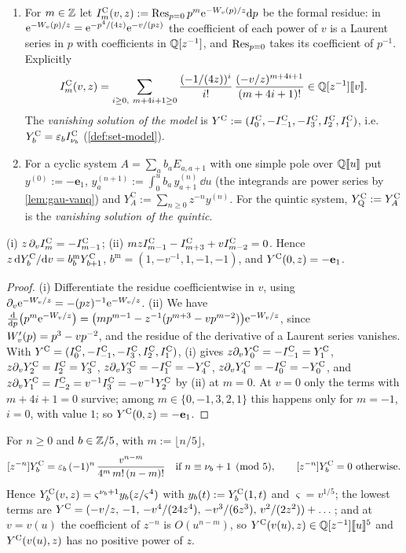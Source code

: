 \begin{defn}
\label{def:gau-van}
\begin{enumerate}
\item For $m\in\mathbb{Z}$ let $I^{\mathrm{C}}_m(v,z):=\operatorname*{Res}_{p=0}p^m\mathrm{e}^{-W_{v}(p)/z}\mathrm{d} p$ be the formal residue: in $\mathrm{e}^{-W_{v}(p)/z}=\mathrm{e}^{-p^4/(4z)}\mathrm{e}^{-v/(pz)}$ the coefficient of each power of $v$ is a Laurent series in $p$ with coefficients in $\mathbb{Q}[z^{-1}]$, and $\operatorname*{Res}_{p=0}$ takes its coefficient of $p^{-1}$. Explicitly
\[
\IC_m(v,z)=\sum_{i\geq0,\ m+4i+1\geq0}\frac{(-1/(4z))^i}{i!}\,\frac{(-v/z)^{m+4i+1}}{(m+4i+1)!}\in\bbQ[z^{-1}]\fps v .
\]
The \emph{vanishing solution of the model} is $Y^{\mathrm{C}}:=(I^{\mathrm{C}}_0,-I^{\mathrm{C}}_{-1},-I^{\mathrm{C}}_3,I^{\mathrm{C}}_2,I^{\mathrm{C}}_1)$, i.e.\ $Y^{\mathrm{C}}_b=\varepsilon_bI^{\mathrm{C}}_{\nu_b}$ (\cref{def:set-model}).
\item For a cyclic system $A=\sum_ab_aE_{a,a+1}$ with one simple pole over $\mathbb{Q}[\![ u ]\!]$ put $y^{(0)}:=-\mathbf e_1$, $y^{(n+1)}_a:=\int_0^ub_a\,y^{(n)}_{a+1}\,\dd u$ (the integrands are power series by \cref{lem:gau-vanq}) and $Y^{\mathrm C}_A:=\sum_{n\geq0}z^{-n}y^{(n)}$. For the quintic system, $Y^{\mathrm{C}}_{\mathrm{Q}}:=Y^{\mathrm C}_A$ is the \emph{vanishing solution of the quintic}.
\end{enumerate}
\end{defn}

\begin{lem}
\label{lem:gau-vanmod}
(i) $z\,\partial_vI^{\mathrm{C}}_m=-I^{\mathrm{C}}_{m-1}$; (ii) $mzI^{\mathrm{C}}_{m-1}-I^{\mathrm{C}}_{m+3}+vI^{\mathrm{C}}_{m-2}=0$. Hence $z\,\mathrm{d}Y^{\mathrm{C}}_b/\mathrm{d} v=b^{\mathrm m}_bY^{\mathrm{C}}_{b+1}$, $b^{\mathrm m}=(1,-v^{-1},1,-1,-1)$, and $Y^{\mathrm{C}}(0,z)=-\mathbf e_1$.
\end{lem}

\begin{proof}
(i) Differentiate the residue coefficientwise in $v$, using $\partial_v\mathrm{e}^{-W_{v}/z}=-(pz)^{-1}\mathrm{e}^{-W_{v}/z}$. (ii) We have $\frac{\mathrm{d}}{\mathrm{d} p}\bigl(p^m\mathrm{e}^{-W_{v}/z}\bigr)=\bigl(mp^{m-1}-z^{-1}(p^{m+3}-vp^{m-2})\bigr)\mathrm{e}^{-W_{v}/z}$, since $W_{v}'(p)=p^3-vp^{-2}$, and the residue of the derivative of a Laurent series vanishes. With $Y^{\mathrm{C}}=(I^{\mathrm{C}}_0,-I^{\mathrm{C}}_{-1},-I^{\mathrm{C}}_3,I^{\mathrm{C}}_2,I^{\mathrm{C}}_1)$, (i) gives $z\partial_vY^{\mathrm{C}}_0=-I^{\mathrm{C}}_{-1}=Y^{\mathrm{C}}_1$, $z\partial_vY^{\mathrm{C}}_2=I^{\mathrm{C}}_2=Y^{\mathrm{C}}_3$, $z\partial_vY^{\mathrm{C}}_3=-I^{\mathrm{C}}_1=-Y^{\mathrm{C}}_4$, $z\partial_vY^{\mathrm{C}}_4=-I^{\mathrm{C}}_0=-Y^{\mathrm{C}}_0$, and $z\partial_vY^{\mathrm{C}}_1=I^{\mathrm{C}}_{-2}=v^{-1}I^{\mathrm{C}}_3=-v^{-1}Y^{\mathrm{C}}_2$ by (ii) at $m=0$. At $v=0$ only the terms with $m+4i+1=0$ survive; among $m\in\{0,-1,3,2,1\}$ this happens only for $m=-1$, $i=0$, with value $1$; so $Y^{\mathrm{C}}(0,z)=-\mathbf e_1$.
\end{proof}

\begin{lem}[Shape of $\YC$]
\label{lem:gau-vanshape}
For $n\geq0$ and $b\in\mathbb{Z}/5$, with $m:=\lfloor n/5\rfloor$,
\[
\coef{z^{-n}}\YC_b=\varepsilon_b\,(-1)^n\,\frac{v^{n-m}}{4^m\,m!\,(n-m)!}\quad\text{if }n\equiv\nu_b+1\pmod5,\qquad \coef{z^{-n}}\YC_b=0\ \text{otherwise}.
\]
Hence $Y^{\mathrm{C}}_b(v,z)=\varsigma^{\nu_b+1}y_b(z/\varsigma^4)$ with $y_b(t):=Y^{\mathrm{C}}_b(1,t)$ and $\varsigma=v^{1/5}$; the lowest terms are $Y^{\mathrm{C}}=(-v/z,\,-1,\,-v^4/(24z^4),\,-v^3/(6z^3),\,v^2/(2z^2))+\dots$; and at $v=v(u)$ the coefficient of $z^{-n}$ is $O(u^{n-m})$, so $Y^{\mathrm{C}}(v(u),z)\in\mathbb{Q}[z^{-1}][\![ u ]\!]^5$ and $Y^{\mathrm{C}}(v(u),z)$ has no positive power of $z$.
\end{lem}

